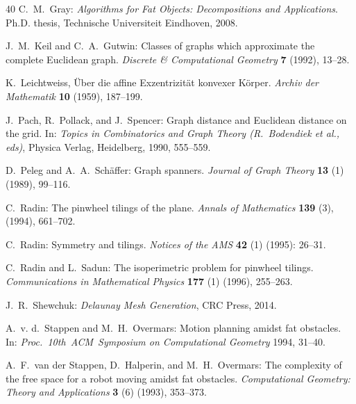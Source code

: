 \documentclass[12pt]{article}
\theoremstyle{plain}
\theoremstyle{definition}
\theoremstyle{remark}
\begin{document}
\begin{thebibliography}{40}
C.~M.~Gray: \emph{Algorithms for Fat Objects: Decompositions and Applications}. Ph.D. thesis, Technische Universiteit Eindhoven, 2008.

J.~M.~Keil and C.~A.~Gutwin: Classes of graphs which approximate the complete Euclidean graph. \emph{Discrete \& Computational Geometry} \textbf{7} (1992), 13--28.

K.~Leichtweiss, \"{U}ber die affine Exzentrizit\"at konvexer K\"orper. \emph{Archiv der Mathematik} \textbf{10} (1959), 187--199.

J.~Pach, R.~Pollack, and J.~Spencer: Graph distance and Euclidean distance on the grid. In: \emph{Topics in Combinatorics and Graph Theory (R.~Bodendiek et al., eds)}, Physica Verlag, Heidelberg, 1990, 555--559.

D.~Peleg and A.~A.~Sch\"affer: Graph spanners. \emph{Journal of Graph Theory} \textbf{13} (1) (1989), 99--116.

C.~Radin: The pinwheel tilings of the plane. \emph{Annals of Mathematics} \textbf{139} (3), (1994), 661--702.

C.~Radin: Symmetry and tilings. \emph{Notices of the AMS} \textbf{42} (1) (1995): 26--31.

C.~Radin and L.~Sadun: The isoperimetric problem for pinwheel tilings. \emph{Communications in Mathematical Physics} \textbf{177} (1) (1996), 255--263.

J.~R.~Shewchuk: \emph{Delaunay Mesh Generation}, CRC Press, 2014.

A.~v. d.~Stappen and M.~H.~Overmars:
Motion planning amidst fat obstacles. In: \emph{Proc.~10th~ACM~Symposium on Computational Geometry} 1994, 31--40.

A.~F.~van der Stappen, D.~Halperin, and M.~H.~Overmars: The complexity of the free space for a robot moving amidst fat obstacles. \emph{Computational Geometry: Theory and Applications} \textbf{3} (6) (1993), 353--373.

\end{thebibliography}
\end{document}
